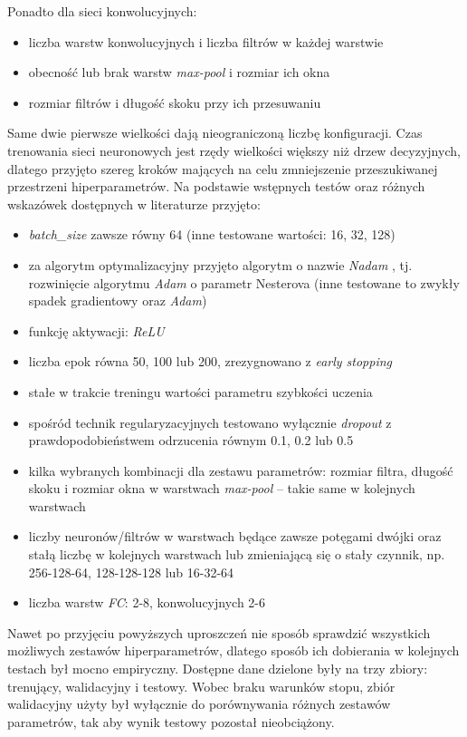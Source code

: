 Ponadto dla sieci konwolucyjnych: 
	\begin{itemize}
		\item liczba warstw konwolucyjnych i liczba filtrów w każdej warstwie
		\item obecność lub brak warstw \textit{max-pool} i rozmiar ich okna
		\item rozmiar filtrów i długość skoku przy ich przesuwaniu
	\end{itemize}

Same dwie pierwsze wielkości dają nieograniczoną liczbę konfiguracji. 
Czas trenowania sieci neuronowych jest rzędy wielkości większy niż drzew decyzyjnych, dlatego przyjęto szereg kroków mających na celu zmniejszenie przeszukiwanej przestrzeni hiperparametrów. Na podstawie wstępnych testów oraz różnych wskazówek dostępnych w literaturze przyjęto:
\begin{itemize}
	\item \textit{batch\_size} zawsze równy 64 (inne testowane wartości: 16, 32, 128)
	\item za algorytm optymalizacyjny przyjęto algorytm o nazwie \textit{Nadam} \cite{Nadam}, tj. rozwinięcie algorytmu \textit{Adam} \cite{KingmaB14} o parametr Nesterova (inne testowane to zwykły spadek gradientowy oraz \textit{Adam})
	\item funkcję aktywacji: \textit{ReLU}
	\item liczba epok równa 50, 100 lub 200, zrezygnowano z \textit{early stopping}
	\item stałe w trakcie treningu wartości parametru szybkości uczenia 
	\item spośród technik regularyzacyjnych testowano wyłącznie \textit{dropout} \cite{srivastava14} z prawdopodobieństwem odrzucenia równym 0.1, 0.2 lub 0.5
	\item kilka wybranych kombinacji dla zestawu parametrów: rozmiar filtra, długość skoku i rozmiar okna w warstwach \textit{max-pool} -- takie same w kolejnych warstwach
	\item liczby neuronów/filtrów w warstwach będące zawsze potęgami dwójki oraz stałą liczbę w kolejnych warstwach lub zmieniającą się o stały czynnik, np. 256-128-64, 128-128-128 lub 16-32-64
	\item liczba warstw \textit{FC}: 2-8, konwolucyjnych 2-6
\end{itemize}

Nawet po przyjęciu powyższych uproszczeń nie sposób sprawdzić wszystkich możliwych zestawów hiperparametrów, dlatego sposób ich dobierania w kolejnych testach był mocno empiryczny. 
Dostępne dane dzielone były na trzy zbiory: trenujący, walidacyjny i testowy. Wobec braku warunków stopu, zbiór walidacyjny użyty był wyłącznie do porównywania różnych zestawów parametrów, tak aby wynik testowy pozostał nieobciążony.

